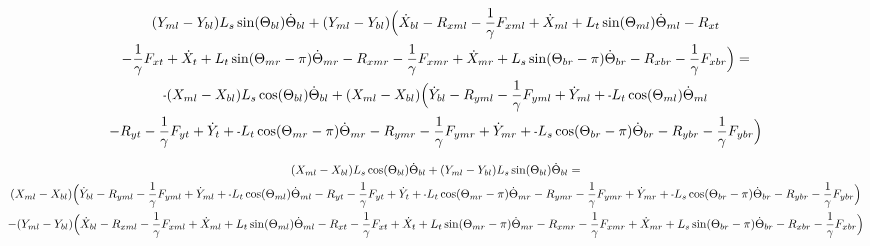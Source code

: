 \documentclass[11pt, landscape]{article}
\newcommand{\mn}{\scalebox{0.7}[1.0]{-}}
\begin{document}
\begin{multline}
(Y_{ml} - Y_{bl})L_{s}\sin(\Theta_{bl}) \dot{\Theta}_{bl} + (Y_{ml} - Y_{bl})\Big( \dot{X}_{bl} - R_{xml} - \frac{1}{\gamma}F_{xml} + \dot{X}_{ml} + L_{t}\sin(\Theta_{ml}) \dot{\Theta}_{ml} - R_{xt } \\
- \frac{1}{\gamma}F_{xt } + \dot{X}_{t } + L_{t}\sin(\Theta_{mr}-\pi)  \dot{\Theta}_{mr} - R_{xmr} 
-\frac{1}{\gamma}F_{xmr} + \dot{X}_{mr} + L_{s}\sin(\Theta_{br}-\pi)  \dot{\Theta}_{br} - R_{xbr} - \frac{1}{\gamma}F_{xbr} \Big) = \\
\mn (X_{ml} - X_{bl}) L_{s}\cos(\Theta_{bl}) \dot{\Theta}_{bl} + (X_{ml} - X_{bl})\Big( \dot{Y}_{bl} - R_{yml} - \frac{1}{\gamma}F_{yml} + \dot{Y}_{ml} + \mn L_{t}\cos(\Theta_{ml}) \dot{\Theta}_{ml} \\
- R_{yt} - \frac{1}{\gamma}F_{yt } + \dot{Y}_{t } + \mn L_{t}\cos(\Theta_{mr}-\pi)  \dot{\Theta}_{mr} - R_{ymr} - \frac{1}{\gamma}F_{ymr} + \dot{Y}_{mr}
+ \mn L_{s}\cos(\Theta_{br}-\pi)  \dot{\Theta}_{br} - R_{ybr} - \frac{1}{\gamma}F_{ybr} \Big)
\end{multline}

\begin{multline}
(X_{ml} - X_{bl}) L_{s}\cos(\Theta_{bl}) \dot{\Theta}_{bl} + (Y_{ml} - Y_{bl})L_{s}\sin(\Theta_{bl}) \dot{\Theta}_{bl} = \\
(X_{ml} - X_{bl})\Big( \dot{Y}_{bl} - R_{yml} - \frac{1}{\gamma}F_{yml} + \dot{Y}_{ml} + \mn L_{t}\cos(\Theta_{ml}) \dot{\Theta}_{ml}
- R_{yt} - \frac{1}{\gamma}F_{yt } + \dot{Y}_{t } + \mn L_{t}\cos(\Theta_{mr}-\pi)  \dot{\Theta}_{mr} - R_{ymr} - \frac{1}{\gamma}F_{ymr} + \dot{Y}_{mr}
+ \mn L_{s}\cos(\Theta_{br}-\pi)  \dot{\Theta}_{br} - R_{ybr} - \frac{1}{\gamma}F_{ybr} \Big) \\
- (Y_{ml} - Y_{bl})\Big( \dot{X}_{bl} - R_{xml} - \frac{1}{\gamma}F_{xml} + \dot{X}_{ml} + L_{t}\sin(\Theta_{ml}) \dot{\Theta}_{ml} - R_{xt } - \frac{1}{\gamma}F_{xt }
+ \dot{X}_{t } + L_{t}\sin(\Theta_{mr}-\pi)  \dot{\Theta}_{mr} - R_{xmr}  -\frac{1}{\gamma}F_{xmr} + \dot{X}_{mr} + L_{s}\sin(\Theta_{br}-\pi)  \dot{\Theta}_{br} - R_{xbr} - \frac{1}{\gamma}F_{xbr} \Big)
\end{multline}
\end{document}
